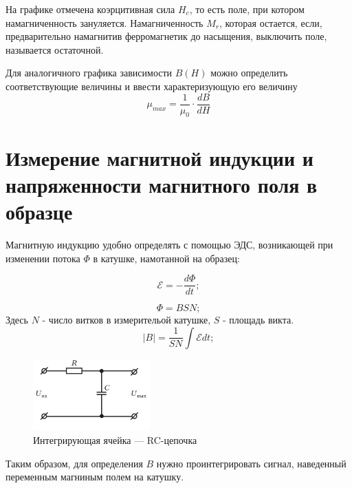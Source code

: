 \documentclass[a4paper]{article}%
\begin{document}
На графике отмечена коэрцитивная сила \textbf{$H_{c}$}, то есть поле, при котором намагниченность зануляется. Намагниченность \textbf{$M_{r}$}, которая остается, если, предварительно намагнитив ферромагнетик до насыщения, выключить поле, называется остаточной.

Для аналогичного графика зависимости $B(H)$ можно определить соответствующие величины и ввести характеризующую его величину
\begin{equation}
\mu_{max} = \frac{1}{\mu_0}\cdot\frac{dB}{dH}
\end{equation}

\section*{Измерение магнитной индукции и напряженности магнитного поля в образце}

Магнитную индукцию удобно определять с помощью ЭДС, возникающей при изменении потока $\Phi$ в катушке, намотанной на образец:



\begin{equation}
\mathscr{E} = -\frac{d\Phi}{dt} ;
\end{equation}

\begin{equation}
\Phi = BSN;
\end{equation}
Здесь $N$ - число витков в измерительой катушке, $S$ - площадь викта.
\begin{equation}
|B| = \frac {1}{SN} \int \mathscr{E}dt;
\end{equation}

\begin{figure}
	\vspace{-20pt}
	\begin{center}
		\includegraphics[width=0.4\textwidth]{int}
	\end{center}
	\vspace{-20pt}
	\caption{Интегрирующая ячейка --- RC-цепочка}
	\vspace{-10pt}
\end{figure}

Таким образом, для определения $B$ нужно проинтегрировать сигнал, наведенный переменным магниным полем на катушку. 
\end{document}
